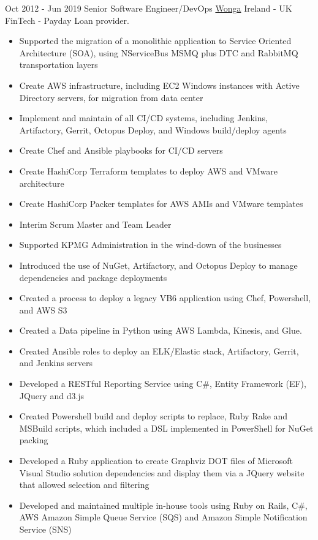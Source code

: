 
\begin{twenty}
\twentyitem
  {Oct 2012 - Jun 2019}
  {Senior Software Engineer/DevOps}
  {{\href{https://www.wonga.com/}{Wonga}}}
  {}
  {Ireland - UK}
  {FinTech - Payday Loan provider.}
  {\begin{itemize}
    \item Supported the migration of a monolithic application to Service Oriented Architecture (SOA), using NServiceBus MSMQ plus DTC and RabbitMQ transportation layers
    \item Create AWS infrastructure, including EC2 Windows instances with Active Directory servers, for migration from data center
    \item Implement and maintain of all CI/CD systems, including Jenkins, Artifactory, Gerrit, Octopus Deploy, and Windows build/deploy agents
    \item Create Chef and Ansible playbooks for CI/CD servers
    \item Create HashiCorp Terraform templates to deploy AWS and VMware architecture
    \item Create HashiCorp Packer templates for AWS AMIs and VMware templates
    \item Interim Scrum Master and Team Leader
    \item Supported KPMG Administration in the wind-down of the businesses
  \end{itemize}}
  {\begin{itemize}
    \item Introduced the use of NuGet, Artifactory, and Octopus Deploy to manage dependencies and package deployments
    \item Created a process to deploy a legacy VB6 application using Chef, Powershell, and AWS S3
    \item Created a Data pipeline in Python using AWS Lambda, Kinesis, and Glue.
    \item Created Ansible roles to deploy an ELK/Elastic stack, Artifactory, Gerrit, and Jenkins servers
    \item Developed a RESTful Reporting Service using C\#, Entity Framework (EF), JQuery and d3.js
    \item Created Powershell build and deploy scripts to replace, Ruby Rake and MSBuild scripts, which included a DSL implemented in PowerShell for NuGet packing
    \item Developed a Ruby application to create Graphviz DOT files of Microsoft Visual Studio solution dependencies and display them via a JQuery website that allowed selection and filtering
    \item Developed and maintained multiple in-house tools using Ruby on Rails, C\#, AWS Amazon Simple Queue Service (SQS) and Amazon Simple Notification Service (SNS)
  \end{itemize}}
\end{twenty}
